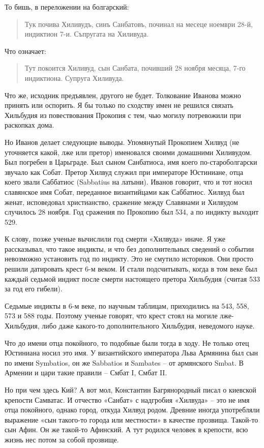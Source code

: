 То бишь, в переложении на болгарский:

\begin{quotation}
Тук почива Хиливудъ, синъ Санбатовъ, починал на месеце ноември 28-й, индиктион 7-и. Съпругата на Хиливуда.
\end{quotation}

Что означает:

\begin{quotation}
Тут покоится Хиливуд, сын Санбата, почивший 28 ноября месяца, 7-го индиктиона. Супруга Хиливуда.
\end{quotation}

Что же, исходник предъявлен, другого не будет. Толкование Иванова можно принять или оспорить. Я бы только по сходству имен не решился связать Хильбудия из повествования Прокопия с тем, чью могилу потревожили при раскопках дома.

Но Иванов делает следующие выводы. Упомянутый Прокопием Хилвуд (не уточняется какой, лже или претор) именовался своими домашними Хиливудом. Был погребен в Царьграде. Был сыном Санбатиоса, имя коего по-староболгарски звучало как Собат. Претор Хилвуд служил при императоре Юстиниане, отца коего звали Саббатиос (Sabbatius на латыни). Иванов говорит, что и тот носил славянское имя Собат, переданное византийцами как Саббатиос. Хилвуд был женат, исповедовал христианство, сражение между Славянами и Хилвудом случилось 28 ноября. Год сражения по Прокопию был 534, а по индикту выходит 529.

К слову, позже ученые вычислили год смерти «Хилвуда» иначе. Я уже рассказывал, что такое индикты, и что без дополнительных сведений о событии невозможно установить год по индикту. Это не смутило историков. Они просто решили датировать крест 6-м веком. И стали подсчитывать, когда в том веке был каждый седьмой индикт после смерти настоящего претора Хильбудия (считая 533 за год его гибели).

Седьмые индикты в 6-м веке, по научным таблицам, приходились на 543, 558, 573 и 588 годы. Поэтому ученые говорят, что крест стоял на могиле лже-Хильбудия, либо даже какого-то дополнительного Хильбудия, неведомого науке. 

Что до имени отца покойного, то подобные были тогда в ходу. Не только отец Юстиниана носил это имя. У византийского императора Льва Армянина был сын по имени Symbatios, он же Sabbatios и Sambates – от армянского Smbat. В Армении и цари такие правили – Смбат I, Смбат II.

Но при чем здесь Кий? А вот мол, Константин Багрянородный писал о киевской крепости Самватас. И отчество «Санбат» с надгробия «Хилвуда» – это не имя отца покойного, однако город, откуда Хилвуд родом. Древние иногда употребляли выражение «сын такого-то города или местности» в качестве прозвища. Такой-то сын Афин. Он же такой-то Афинский. А тут родился человек в крепости, всю жизнь нес потом за собой прозвище.

